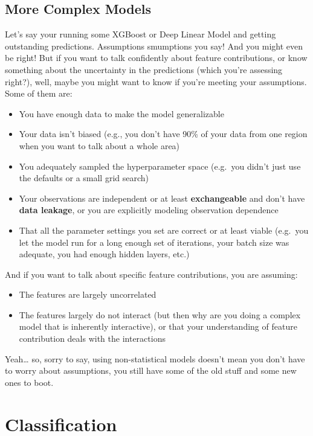 \documentclass[
  letterpaper,
]{krantz}
\providecommand{\tightlist}{%
  \setlength{\itemsep}{0pt}\setlength{\parskip}{0pt}}\usepackage{longtable,booktabs,array}
\begin{document}
\subsection{More Complex Models}\label{sec-lm-more-complex}

Let's say your running some XGBoost or Deep Linear Model and getting
outstanding predictions. Assumptions smumptions you say! And you might
even be right! But if you want to talk confidently about feature
contributions, or know something about the uncertainty in the
predictions (which you're assessing right?), well, maybe you might want
to know if you're meeting your assumptions. Some of them are:

\begin{itemize}
\tightlist
\item
  You have enough data to make the model generalizable
\item
  Your data isn't biased (e.g., you don't have 90\% of your data from
  one region when you want to talk about a whole area)
\item
  You adequately sampled the hyperparameter space (e.g.~you didn't just
  use the defaults or a small grid search)
\item
  Your observations are independent or at least \textbf{exchangeable}
  and don't have \textbf{data leakage}, or you are explicitly modeling
  observation dependence
\item
  That all the parameter settings you set are correct or at least viable
  (e.g.~you let the model run for a long enough set of iterations, your
  batch size was adequate, you had enough hidden layers, etc.)
\end{itemize}

And if you want to talk about specific feature contributions, you are
assuming:

\begin{itemize}
\tightlist
\item
  The features are largely uncorrelated
\item
  The features largely do not interact (but then why are you doing a
  complex model that is inherently interactive), or that your
  understanding of feature contribution deals with the interactions
\end{itemize}

Yeah\ldots{} so, sorry to say, using non-statistical models doesn't mean
you don't have to worry about assumptions, you still have some of the
old stuff and some new ones to boot.

\section{Classification}\label{sec-lm-classification}
\end{document}
